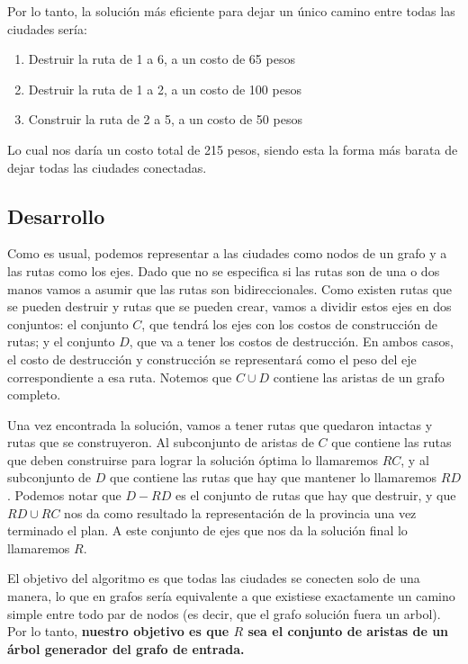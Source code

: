 \bigskip

Por lo tanto, la solución más eficiente para dejar un único camino entre todas las ciudades sería:

\begin{enumerate}
	\item Destruir la ruta de 1 a 6, a un costo de 65 pesos

	\item Destruir la ruta de 1 a 2, a un costo de 100 pesos

	\item Construir la ruta de 2 a 5, a un costo de 50 pesos
\end{enumerate}

Lo cual nos daría un costo total de 215 pesos, siendo esta la forma más barata de dejar todas las ciudades conectadas.

\subsection{Desarrollo}
Como es usual, podemos representar a las ciudades como nodos de un grafo y a las rutas como los ejes. Dado que no se especifica si las rutas son de una o dos manos vamos a asumir que las rutas son bidireccionales. Como existen rutas que se pueden destruir y rutas que se pueden crear, vamos a dividir estos ejes en dos conjuntos: el conjunto $C$, que tendrá los ejes con los costos de construcción de rutas; y el conjunto $D$, que va a tener los costos de destrucción. En ambos casos, el costo de destrucción y construcción se representará como el peso del eje correspondiente a esa ruta. Notemos que $C \cup D$ contiene las aristas de un grafo completo. %


Una vez encontrada la solución, vamos a tener rutas que quedaron intactas y rutas que se construyeron. Al subconjunto de aristas de $C$ que contiene las rutas que deben construirse para lograr la solución óptima lo llamaremos $RC$, y al subconjunto de $D$ que contiene las rutas que hay que mantener lo llamaremos $RD$. Podemos notar que $D - RD$ es el conjunto de rutas que hay que destruir, y que $RD \cup RC$ nos da como resultado la representación de la provincia una vez terminado el plan. A este conjunto de ejes que nos da la solución final lo llamaremos $R$. %

El objetivo del algoritmo es que todas las ciudades se conecten solo de una manera, lo que en grafos sería equivalente a que existiese exactamente un camino simple entre todo par de
nodos (es decir, que el grafo solución fuera un arbol). Por lo tanto, \textbf{nuestro objetivo es que $R$ sea el conjunto de aristas de un árbol generador del grafo de entrada.} %


